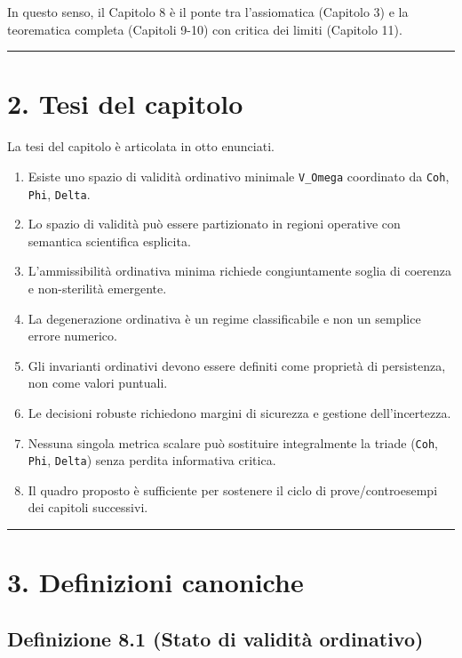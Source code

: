 In questo senso, il Capitolo 8 è il ponte tra l'assiomatica (Capitolo 3) e la teorematica completa (Capitoli 9-10) con critica dei limiti (Capitolo 11).

\begin{center}\rule{0.5\linewidth}{0.5pt}\end{center}

\section{2. Tesi del capitolo}

La tesi del capitolo è articolata in otto enunciati.

\begin{enumerate}
\def\labelenumi{\arabic{enumi}.}
\tightlist
\item
  Esiste uno spazio di validità ordinativo minimale \texttt{V\_Omega} coordinato da \texttt{Coh}, \texttt{Phi}, \texttt{Delta}.
\item
  Lo spazio di validità può essere partizionato in regioni operative con semantica scientifica esplicita.
\item
  L'ammissibilità ordinativa minima richiede congiuntamente soglia di coerenza e non-sterilità emergente.
\item
  La degenerazione ordinativa è un regime classificabile e non un semplice errore numerico.
\item
  Gli invarianti ordinativi devono essere definiti come proprietà di persistenza, non come valori puntuali.
\item
  Le decisioni robuste richiedono margini di sicurezza e gestione dell'incertezza.
\item
  Nessuna singola metrica scalare può sostituire integralmente la triade (\texttt{Coh}, \texttt{Phi}, \texttt{Delta}) senza perdita informativa critica.
\item
  Il quadro proposto è sufficiente per sostenere il ciclo di prove/controesempi dei capitoli successivi.
\end{enumerate}

\begin{center}\rule{0.5\linewidth}{0.5pt}\end{center}

\section{3. Definizioni canoniche}

\subsection{Definizione 8.1 (Stato di validità ordinativo)}

